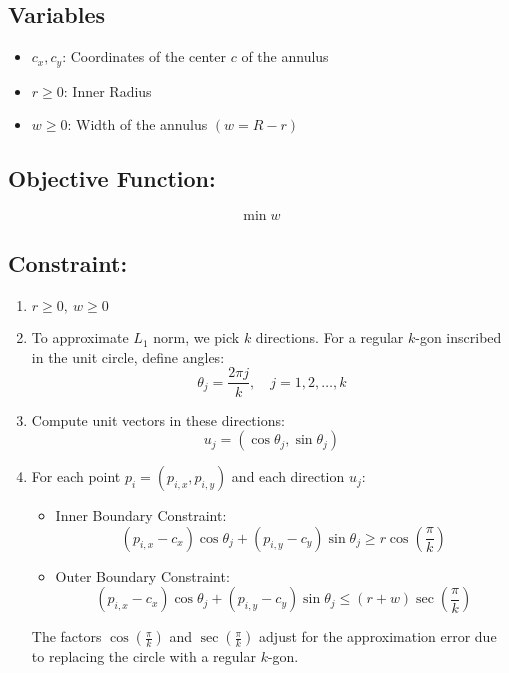 \documentclass{article}
\begin{document}
\subsection*{Variables}
\begin{itemize}
    \item \( c_x, c_y \): Coordinates of the center $c$ of the annulus
    \item \( r \geq 0 \): Inner Radius 
    \item \( w \geq 0 \): Width of the annulus \( (w = R - r) \)
\end{itemize}

\subsection*{Objective Function: }
\[ \min w  \]

\subsection*{Constraint: }
\begin{enumerate}
    \item \(r \geq 0, \ w \geq 0 \)
    \item To approximate $L_1$ norm, we pick $k$ directions. For a regular $k$-gon inscribed in the unit circle, define angles:
    \[
        \theta_j = \frac{2\pi j}{k}, \quad j = 1, 2, \ldots, k
    \]
    \item Compute unit vectors in these directions:
    \[
        u_j = (\cos \theta_j, \sin \theta_j)
    \]
    \item For each point \( p_i = (p_{i,x}, p_{i,y}) \) and each direction \( u_j \):
    \begin{itemize}
        \item Inner Boundary Constraint:
        \[
            (p_{i,x} - c_x) \cos \theta_j + (p_{i,y} - c_y) \sin \theta_j \geq r \cos\left(\frac{\pi}{k}\right)
        \]
        \item Outer Boundary Constraint:
        \[
            (p_{i,x} - c_x) \cos \theta_j + (p_{i,y} - c_y) \sin \theta_j \leq (r + w) \sec\left(\frac{\pi}{k}\right)
        \]
    \end{itemize}
    The factors \( \cos\left(\frac{\pi}{k}\right) \) and \( \sec\left(\frac{\pi}{k}\right) \) adjust for the approximation error due to replacing the circle with a regular \( k \)-gon.
\end{enumerate}
\end{document}
